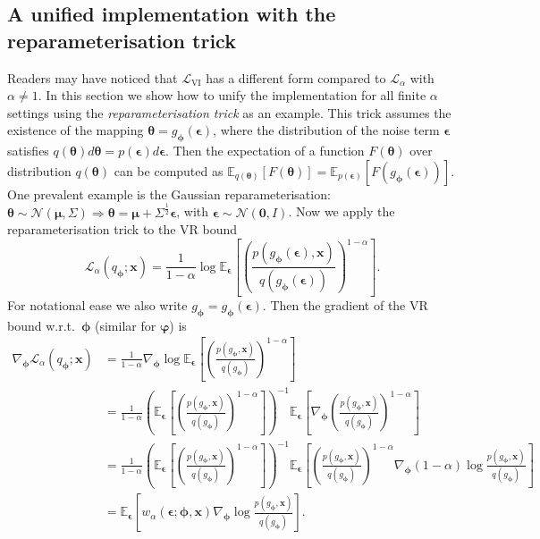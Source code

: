 \subsection{A unified implementation with the reparameterisation trick}

Readers may have noticed that $\mathcal{L}_{\text{VI}}$ has a different form compared to $\mathcal{L}_{\alpha}$ with $\alpha \neq 1$. In this section we show how to unify the implementation for all finite $\alpha$ settings using the \emph{reparameterisation trick} \citep{salimans:reparam2013, kingma:vae2014} as an example. This trick assumes the existence of the mapping $\bm{\theta} = g_{\bm{\phi}}(\bm{\epsilon})$, where the distribution of the noise term $\bm{\epsilon}$ satisfies $q(\bm{\theta}) d\bm{\theta} = p(\bm{\epsilon}) d\bm{\epsilon}$. Then the expectation of a function $F(\bm{\theta})$ over distribution $q(\bm{\theta})$ can be computed as
%
$\mathbb{E}_{q(\bm{\theta})} [F(\bm{\theta})] = \mathbb{E}_{p(\bm{\epsilon})} [F(g_{\bm{\phi}}(\bm{\epsilon}))].$
%
One prevalent example is the Gaussian reparameterisation: $\bm{\theta} \sim \mathcal{N}(\bm{\mu}, \Sigma) \Rightarrow \bm{\theta} = \bm{\mu} + \Sigma^{ \frac{1}{2} } \bm{\epsilon}$, with $\bm{\epsilon} \sim \mathcal{N}(\bm{0}, I)$. 
%
Now we apply the reparameterisation trick to the VR bound
%
\begin{equation}
\mathcal{L}_{\alpha}(q_{\bm{\phi}}; \bm{x}) = \frac{1}{1 - \alpha} \log \mathbb{E}_{\bm{\epsilon}} \left[\left( \frac{p(g_{\bm{\phi}}(\bm{\epsilon}) , \bm{x})}{q(g_{\bm{\phi}}(\bm{\epsilon}))} \right)^{1 - \alpha} \right].
\end{equation}
%
For notational ease we also write $g_{\bm{\phi}} = g_{\bm{\phi}}(\bm{\epsilon})$. Then the gradient of the VR bound w.r.t.~$\bm{\phi}$ (similar for $\bm{\varphi}$) is
\begin{equation}
\begin{aligned}
\nabla_{\bm{\phi}} \mathcal{L}_{\alpha}(q_{\bm{\phi}}; \bm{x}) 
&= \frac{1}{1 - \alpha} \nabla_{\bm{\phi}} \log \mathbb{E}_{\bm{\epsilon}} \left[ \left( \frac{p(g_{\bm{\phi}}, \bm{x})}{q(g_{\bm{\phi}})} \right)^{1 - \alpha} \right] \\
&= \frac{1}{1 - \alpha} \left( \mathbb{E}_{\bm{\epsilon}} \left[ \left( \frac{p(g_{\bm{\phi}}, \bm{x})}{q(g_{\bm{\phi}})} \right)^{1 - \alpha} \right] \right)^{-1} \mathbb{E}_{\bm{\epsilon}} \left[ \nabla_{\bm{\phi}} \left( \frac{p(g_{\bm{\phi}}, \bm{x})}{q(g_{\bm{\phi}})} \right)^{1 - \alpha} \right] \\
&= \frac{1}{1 - \alpha} \left( \mathbb{E}_{\bm{\epsilon}} \left[ \left( \frac{p(g_{\bm{\phi}}, \bm{x})}{q(g_{\bm{\phi}})} \right)^{1 - \alpha} \right] \right)^{-1} \mathbb{E}_{\bm{\epsilon}} \left[ \left( \frac{p(g_{\bm{\phi}}, \bm{x})}{q(g_{\bm{\phi}})} \right)^{1 - \alpha} \nabla_{\bm{\phi}} (1 - \alpha) \log \frac{p(g_{\bm{\phi}}, \bm{x})}{q(g_{\bm{\phi}})} \right] \\
&= \mathbb{E}_{\bm{\epsilon}} \left[ w_{\alpha}(\bm{\epsilon}; \bm{\phi}, \bm{x}) \nabla_{\bm{\phi}} \log \frac{p(g_{\bm{\phi}}, \bm{x})}{q(g_{\bm{\phi}})} \right].
\end{aligned}
\label{eq:chap4_vrbound_gradient_reparam}
\end{equation}
